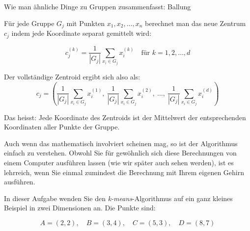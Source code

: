 \begin{lpu}{Wie man ähnliche Dinge zu Gruppen zusammenfasst: Ballung}
\begin{theorie}
Für jede Gruppe \( G_j \) mit Punkten \( x_1, x_2, \dots, x_n\) berechnet man das neue Zentrum \( c_j\) indem jede Koordinate separat gemittelt wird:

\[
c_j^{(k)} = \frac{1}{|G_j|} \sum_{x_i \in G_j} x_i^{(k)} \quad \text{für } k = 1, 2, \dots, d
\]

Der vollständige Zentroid ergibt sich also als:
\[
c_j = \left( \frac{1}{|G_j|} \sum_{x_i \in G_j} x_i^{(1)},\ 
             \frac{1}{|G_j|} \sum_{x_i \in G_j} x_i^{(2)},\ 
             \dots,\ 
             \frac{1}{|G_j|} \sum_{x_i \in G_j} x_i^{(d)} \right)
\]

Das heisst: Jede Koordinate des Zentroids ist der Mittelwert der entsprechenden Koordinaten aller Punkte der Gruppe.
\end{theorie}

Auch wenn das mathematisch involviert scheinen mag, so ist der Algorithmus einfach zu verstehen. Obwohl Sie für gewöhnlich sich diese Berechnungen von einem Computer ausführen lassen (wie wir später auch sehen werden), ist es lehrreich, wenn Sie einmal zumindest die Berechnung mit Ihrem eigenen Gehirn ausführen.

\begin{aufgabe}{4}
In dieser Aufgabe wenden Sie den \textit{k-means}-Algorithmus auf ein ganz kleines Beispiel in zwei Dimensionen an. Die Punkte sind:

\[
A = (2, 2),\quad B = (3, 4),\quad C = (5, 3),\quad D = (8, 7)
\]

\begin{center}
\end{center}


\end{aufgabe}
\end{lpu}
